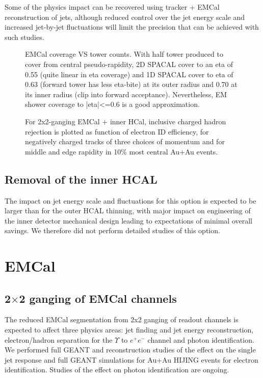 Some of the physics impact can be recovered using tracker + EMCal reconstruction of jets, although reduced control over the jet 
energy scale and increased jet-by-jet fluctuations will limit the precision that can be achieved with such studies.

\begin{figure}[hbt]
  \centering
  \caption{EMCal coverage VS tower counts. With half tower produced to cover from central pseudo-rapidity, 2D SPACAL cover to an eta of 0.55 (quite linear in eta coverage) and 1D SPACAL cover to eta of 0.63 (forward tower has less eta-bite) at its outer radius and 0.70 at its inner radius (clip into forward acceptance). Nevertheless, EM shower coverage to |eta|<=0.6 is a good approximation.}
  \label{fig:eta_tower_fraction}
\end{figure}

\begin{figure}[hbt]
  \centering
  \caption{For 2x2-ganging EMCal + inner HCal, inclusive charged
    hadron rejection is plotted as function of electron ID efficiency,
    for negatively charged tracks of three choices of momentum and for
    middle and edge rapidity in 10\% most central Au+Au events.}
  \label{fig:eid_auau}
\end{figure}


\subsection{Removal of the inner HCAL}

The impact on jet energy scale and fluctuations for this option is expected to be larger than for the outer HCAL thinning, 
with major impact on engineering of the inner detector mechanical design leading to expectations of minimal overall savings.
We therefore did not perform detailed studies of this option.

\section{EMCal}
\subsection{2$\times$2 ganging of EMCal channels}
The reduced EMCal segmentation from 2x2 ganging of readout channels is expected to affect three physics areas: jet finding 
and jet energy reconstruction, electron/hadron separation for the $\Upsilon$ to $e^+ e^-$ channel and photon identification.
We performed full GEANT and reconstruction studies of the effect on the single jet response and full GEANT simulations for 
Au+Au HIJING events for electron identification. Studies of the effect on photon identification are ongoing.

